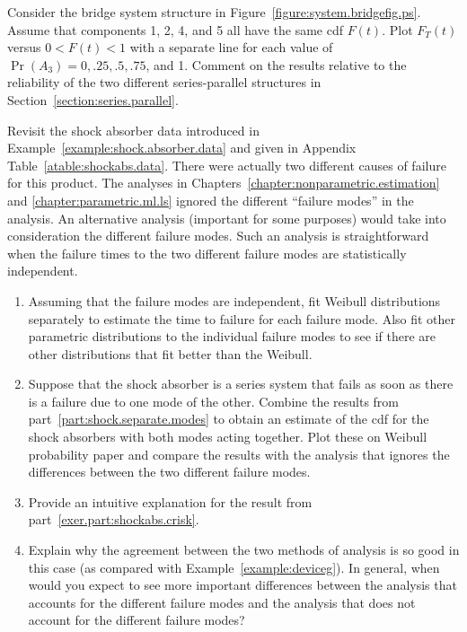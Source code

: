 \begin{exercise}
\label{exercise:sp.bridge.comp}
Consider the bridge system structure in
Figure~\ref{figure:system.bridgefig.ps}. Assume that components 1,
2, 4, and 5 all have the same cdf $F(t)$. Plot $F_{T}(t)$ versus $0
< F(t) < 1 $ with a separate line for each value of $\Pr( A_{3})= 0,
.25, .5, .75$, and 1. Comment on the results relative to the
reliability of the two different series-parallel structures in
Section~\ref{section:series.parallel}.
\end{exercise}

\begin{exercise}
Revisit the shock absorber data introduced in
Example~\ref{example:shock.absorber.data} and given in
Appendix Table~\ref{atable:shockabs.data}.  There were actually two different
causes of failure for this product. The analyses in
Chapters~\ref{chapter:nonparametric.estimation} and
\ref{chapter:parametric.ml.ls} ignored the different
``failure modes'' in the analysis. An alternative analysis (important
for some purposes) would take into consideration the different
failure modes. Such an analysis is straightforward when
the failure times to the two different
failure modes are statistically independent.
     \begin{enumerate}
\item
\label{part:shock.separate.modes}
Assuming that the failure modes are independent, fit Weibull
distributions separately to estimate the time to failure for each
failure mode.  Also fit other parametric distributions to the
individual failure modes to see if there are other distributions that fit
better than the Weibull.
\item
\label{exer.part:shockabs.crisk}
Suppose that the shock absorber is a series system that fails as soon
as there is a failure due to one mode of the other.  Combine the
results from part~\ref{part:shock.separate.modes} to obtain an
estimate of the cdf for the shock absorbers with both modes acting
together.  Plot these on Weibull probability paper and compare the
results with the analysis that ignores the differences between the two
different failure modes.
\item
Provide an intuitive explanation for the result from
part~\ref{exer.part:shockabs.crisk}.
\item
Explain why the agreement between the two methods of analysis is so
good in this case (as compared with Example~\ref{example:deviceg}). In
general, when would you expect to see more important differences
between the analysis that accounts for the different failure modes and
the analysis that does not account for the different failure modes?
\end{enumerate}
\end{exercise}


